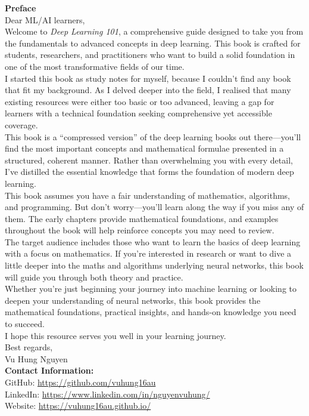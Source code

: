 \documentclass[10pt,\papersize,twoside,openright]{book}
\begin{document}
\begin{flushleft}
\textbf{Preface}\\[1em]

Dear ML/AI learners,\\[0.5em]

Welcome to \textit{Deep Learning 101}, a comprehensive guide designed to take you from the fundamentals to advanced concepts in deep learning. This book is crafted for students, researchers, and practitioners who want to build a solid foundation in one of the most transformative fields of our time.\\[0.5em]

I started this book as study notes for myself, because I couldn't find any book that fit my background. As I delved deeper into the field, I realised that many existing resources were either too basic or too advanced, leaving a gap for learners with a technical foundation seeking comprehensive yet accessible coverage.\\[0.5em]

This book is a ``compressed version'' of the deep learning books out there---you'll find the most important concepts and mathematical formulae presented in a structured, coherent manner. Rather than overwhelming you with every detail, I've distilled the essential knowledge that forms the foundation of modern deep learning.\\[0.5em]

This book assumes you have a fair understanding of mathematics, algorithms, and programming. But don't worry---you'll learn along the way if you miss any of them. The early chapters provide mathematical foundations, and examples throughout the book will help reinforce concepts you may need to review.\\[0.5em]

The target audience includes those who want to learn the basics of deep learning with a focus on mathematics. If you're interested in research or want to dive a little deeper into the maths and algorithms underlying neural networks, this book will guide you through both theory and practice.\\[0.5em]

Whether you're just beginning your journey into machine learning or looking to deepen your understanding of neural networks, this book provides the mathematical foundations, practical insights, and hands-on knowledge you need to succeed.\\[0.5em]

I hope this resource serves you well in your learning journey.\\[1em]

Best regards,\\
Vu Hung Nguyen\\[1em]

\textbf{Contact Information:}\\
GitHub: \url{https://github.com/vuhung16au}\\
LinkedIn: \url{https://www.linkedin.com/in/nguyenvuhung/}\\
Website: \url{https://vuhung16au.github.io/}
\end{flushleft}
\vspace*{\fill}
\clearpage
\end{document}

